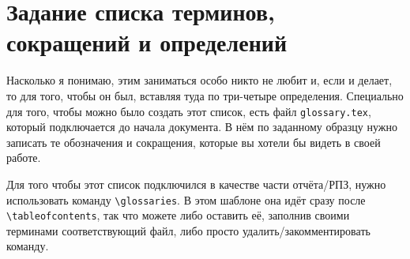 \section{Задание списка терминов, сокращений и определений}

Насколько я понимаю, этим заниматься особо никто не любит и, если и делает, 
то для того, чтобы он был, вставляя туда по три-четыре определения. 
Специально для того, чтобы можно было создать этот список, есть файл 
\texttt{glossary.tex}, который подключается до начала документа. 
В нём по заданному образцу нужно записать те обозначения и сокращения, 
которые вы хотели бы видеть в своей работе. 

Для того чтобы этот список подключился в качестве части отчёта/РПЗ, 
нужно использовать команду \texttt{\textbackslash glossaries}. В этом 
шаблоне она идёт сразу после \texttt{\textbackslash tableofcontents}, так 
что можете либо оставить её, заполнив своими терминами соответствующий файл, 
либо просто удалить/закомментировать команду.
